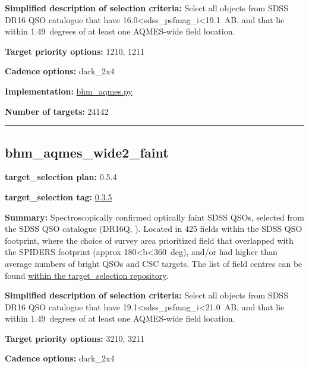 \noindent\textbf{Simplified description of selection criteria:} Select all
objects from SDSS DR16 QSO catalogue that have
16.0\textless{}sdss\_psfmag\_i\textless{}19.1~AB, and that lie within
1.49~degrees of at least one AQMES-wide field location.


\noindent\textbf{Target priority options:} 1210, 1211

\noindent\textbf{Cadence options:} dark\_2x4

\noindent\textbf{Implementation:}
\href{https://github.com/sdss/target_selection/blob/0.3.5/python/target_selection/cartons/bhm_aqmes.py}{bhm\_aqmes.py}

\noindent\textbf{Number of targets:} 24142

\begin{center}\rule{0.5\linewidth}{0.5pt}\end{center}

\hypertarget{bhm_aqmes_wide2_faint_plan0.5.4}{%
\subsection{bhm\_aqmes\_wide2\_faint}\label{bhm_aqmes_wide2_faint_plan0.5.4}}

\noindent\textbf{target\_selection plan:} 0.5.4

\noindent\textbf{target\_selection tag:}
\href{https://github.com/sdss/target_selection/tree/0.3.5/}{0.3.5}

\noindent\textbf{Summary:} Spectroscopically confirmed optically faint SDSS QSOs,
selected from the SDSS QSO catalogue (DR16Q,
\citealt{Lyke2020}). Located in 425 fields within the SDSS QSO footprint,
where the choice of survey area prioritized field that overlapped with
the SPIDERS footprint (approx 180\textless{}b\textless{}360~deg), and/or
had higher than average numbers of bright QSOs and CSC targets. The list
of field centres can be found
\href{https://github.com/sdss/target_selection/blob/0.3.0/python/target_selection/masks/candidate_target_fields_bhm_aqmes_wide_v0.3.1.fits}{within
the target\_selection repository}.

\noindent\textbf{Simplified description of selection criteria:} Select all
objects from SDSS DR16 QSO catalogue that have
19.1\textless{}sdss\_psfmag\_i\textless{}21.0~AB, and that lie within
1.49~degrees of at least one AQMES-wide field location.


\noindent\textbf{Target priority options:} 3210, 3211

\noindent\textbf{Cadence options:} dark\_2x4

